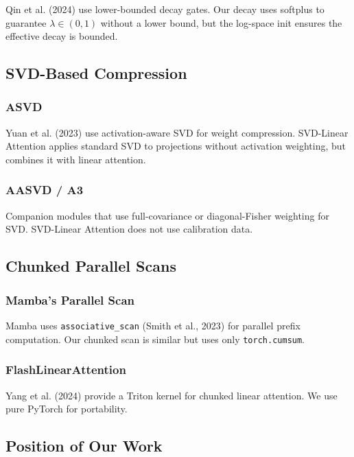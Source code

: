 Qin et al. (2024) use lower-bounded decay gates. Our decay uses softplus 
to guarantee $\lambda \in (0, 1)$ without a lower bound, but the log-space 
init ensures the effective decay is bounded.

\subsection{SVD-Based Compression}

\subsubsection{ASVD}

Yuan et al. (2023) use activation-aware SVD for weight compression. 
SVD-Linear Attention applies standard SVD to projections without 
activation weighting, but combines it with linear attention.

\subsubsection{AASVD / A3}

Companion modules that use full-covariance or diagonal-Fisher weighting 
for SVD. SVD-Linear Attention does not use calibration data.

\subsection{Chunked Parallel Scans}

\subsubsection{Mamba's Parallel Scan}

Mamba uses \texttt{associative\_scan} (Smith et al., 2023) for parallel prefix 
computation. Our chunked scan is similar but uses only \texttt{torch.cumsum}.

\subsubsection{FlashLinearAttention}

Yang et al. (2024) provide a Triton kernel for chunked linear attention. 
We use pure PyTorch for portability.

\subsection{Position of Our Work}

